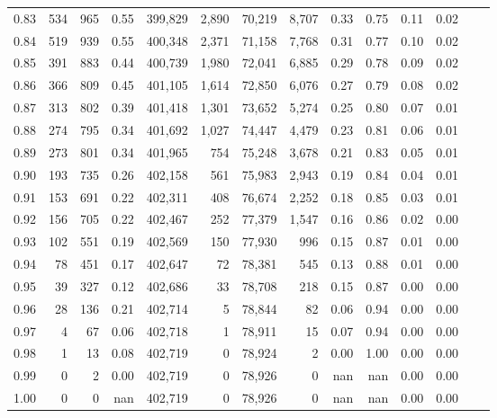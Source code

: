\begin{tabular}{rrrrrrrrrrrrrr}
0.83 &    534 &    965 &     0.55 &  399,829 &    2,890 &  70,219 &   8,707 &  0.33 &  0.75 &  0.11 &      0.02 \\
0.84 &    519 &    939 &     0.55 &  400,348 &    2,371 &  71,158 &   7,768 &  0.31 &  0.77 &  0.10 &      0.02 \\
0.85 &    391 &    883 &     0.44 &  400,739 &    1,980 &  72,041 &   6,885 &  0.29 &  0.78 &  0.09 &      0.02 \\
0.86 &    366 &    809 &     0.45 &  401,105 &    1,614 &  72,850 &   6,076 &  0.27 &  0.79 &  0.08 &      0.02 \\
0.87 &    313 &    802 &     0.39 &  401,418 &    1,301 &  73,652 &   5,274 &  0.25 &  0.80 &  0.07 &      0.01 \\
0.88 &    274 &    795 &     0.34 &  401,692 &    1,027 &  74,447 &   4,479 &  0.23 &  0.81 &  0.06 &      0.01 \\
0.89 &    273 &    801 &     0.34 &  401,965 &      754 &  75,248 &   3,678 &  0.21 &  0.83 &  0.05 &      0.01 \\
0.90 &    193 &    735 &     0.26 &  402,158 &      561 &  75,983 &   2,943 &  0.19 &  0.84 &  0.04 &      0.01 \\
0.91 &    153 &    691 &     0.22 &  402,311 &      408 &  76,674 &   2,252 &  0.18 &  0.85 &  0.03 &      0.01 \\
0.92 &    156 &    705 &     0.22 &  402,467 &      252 &  77,379 &   1,547 &  0.16 &  0.86 &  0.02 &      0.00 \\
0.93 &    102 &    551 &     0.19 &  402,569 &      150 &  77,930 &     996 &  0.15 &  0.87 &  0.01 &      0.00 \\
0.94 &     78 &    451 &     0.17 &  402,647 &       72 &  78,381 &     545 &  0.13 &  0.88 &  0.01 &      0.00 \\
0.95 &     39 &    327 &     0.12 &  402,686 &       33 &  78,708 &     218 &  0.15 &  0.87 &  0.00 &      0.00 \\
0.96 &     28 &    136 &     0.21 &  402,714 &        5 &  78,844 &      82 &  0.06 &  0.94 &  0.00 &      0.00 \\
0.97 &      4 &     67 &     0.06 &  402,718 &        1 &  78,911 &      15 &  0.07 &  0.94 &  0.00 &      0.00 \\
0.98 &      1 &     13 &     0.08 &  402,719 &        0 &  78,924 &       2 &  0.00 &  1.00 &  0.00 &      0.00 \\
0.99 &      0 &      2 &     0.00 &  402,719 &        0 &  78,926 &       0 &   nan &   nan &  0.00 &      0.00 \\
1.00 &      0 &      0 &      nan &  402,719 &        0 &  78,926 &       0 &   nan &   nan &  0.00 &      0.00 \\
\bottomrule
\end{tabular}
